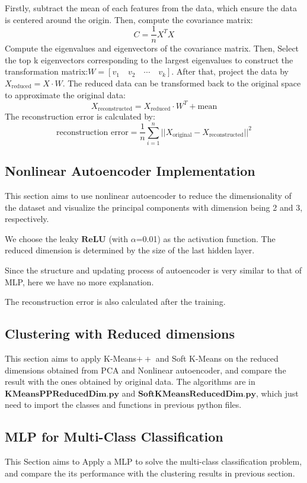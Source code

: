\documentclass{article}
\begin{document}
Firstly, subtract the mean of each features from the data, which ensure the data is centered around the origin. Then, compute the covariance matrix:
$$
C=\frac{1}{n}X^TX
$$
Compute the eigenvalues and eigenvectors of the covariance matrix. Then, Select the top k eigenvectors corresponding to the largest eigenvalues to construct the transformation matrix:$W=[v_1\quad v_2\quad \cdots\quad v_k]$. After that, project the data by $X_{\text{reduced}}=X\cdot W$. The reduced data can be transformed back to the original space to approximate the original data:
$$
X_{\text{reconstructed}}=X_{\text{reduced}}\cdot W^T+\text{mean}
$$
The reconstruction error is calculated by:
$$
\text{reconstruction error}=\frac{1}{n}\sum_{i=1}^{n}|| X_{\text{original}}-X_{\text{reconstructed}} ||^2
$$

\subsection{Nonlinear Autoencoder Implementation}
This section aims to use nonlinear autoencoder to reduce the dimensionality of the dataset and visualize the principal components with dimension being 2 and 3, respectively.

We choose the leaky $\mathbf{ReLU}$ (with $\alpha$=0.01) as the activation function. The reduced dimension is determined by the size of the last hidden layer.

Since the structure and updating process of autoencoder is very similar to that of MLP, here we have no more explanation.

The reconstruction error is also calculated after the training.

\subsection{Clustering with Reduced dimensions}
This section aims to apply K-Means$++$ and Soft K-Means on the reduced dimensions obtained from PCA and Nonlinear autoencoder, and compare the result with the ones obtained by original data. The algorithms are in $\mathbf{KMeansPPReducedDim.py}$ and $\mathbf{SoftKMeansReducedDim.py}$, which just need to import the classes and functions in previous python files.

\subsection{MLP for Multi-Class Classification}
This Section aims to Apply a MLP to solve the multi-class classification problem, and compare the its performance with the clustering results in previous section.
\end{document}
